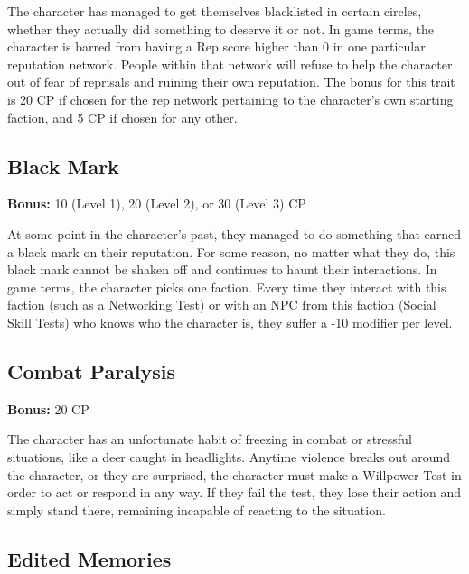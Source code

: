 
The character has managed to get themselves blacklisted in certain circles, whether they actually did something to deserve it or not. In game terms, the character is barred from having a Rep score higher than 0 in one particular reputation network. People within that network will refuse to help the character out of fear of reprisals and ruining their own reputation. The bonus for this trait is 20 CP if chosen for the rep network pertaining to the character’s own starting faction, and 5 CP if chosen for any other.

\subsection{Black Mark}
\label{sec:traits-black-mark}

\textbf{Bonus:} 10 (Level 1), 20 (Level 2), or 30 (Level 3) CP

At some point in the character’s past, they managed to do something that earned a black mark on their reputation. For some reason, no matter what they do, this black mark cannot be shaken off and continues to haunt their interactions. In game terms, the character picks one faction. Every time they interact with this faction (such as a Networking Test) or with an NPC from this faction (Social Skill Tests) who knows who the character is, they suffer a -10 modifier per level.

\subsection{Combat Paralysis}
\label{sec:traits-combat-paralysis}

\textbf{Bonus:} 20 CP

The character has an unfortunate habit of freezing in combat or stressful situations, like a deer caught in headlights. Anytime violence breaks out around the character, or they are surprised, the character must make a Willpower Test in order to act or respond in any way. If they fail the test, they lose their action and simply stand there, remaining incapable of reacting to the situation.

\subsection{Edited Memories}
\label{sec:traits-edited-memories}

